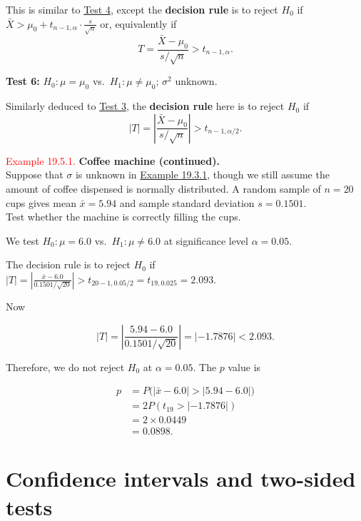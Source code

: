 \documentclass[
]{book}
\begin{document}
This is similar to \protect\hyperlink{Sec_Hypo_Test:test4}{Test 4}, except the {\textbf{decision rule}} is to reject \(H_0\) if \(\bar{X} > \mu_0 + t_{n-1,\alpha} \cdot \frac{s}{\sqrt{n}}\) or, equivalently if\\

\[T = \frac{\bar{X} - \mu_0}{s/\sqrt{n}} > t_{n-1,\alpha}.\]

\leavevmode{}%
{\textbf{Test 6:}} \(H_0: \mu = \mu_0\) vs.~\(H_1: \mu \neq \mu_0\); \(\sigma^2\) unknown.

Similarly deduced to \protect\hyperlink{Sec_Hypo_Test:test3}{Test 3}, the {\textbf{decision rule}} here is to reject \(H_0\) if\\

\[|T| = \left| \frac{\bar{X}-\mu_0}{s/\sqrt{n}} \right| > t_{n-1,\alpha/2}.\]

\leavevmode{}%
\textcolor{red}{Example 19.5.1.}
{\textbf{Coffee machine (continued).}}\\
Suppose that \(\sigma\) is unknown in \protect\hyperlink{coffee_machine_ex}{Example 19.3.1}, though we still assume the amount of coffee dispensed is normally distributed. A random sample of \(n=20\) cups gives mean \(\bar{x} = 5.94\) and sample standard deviation \(s = 0.1501\).\\
Test whether the machine is correctly filling the cups.

We test \(H_0: \mu = 6.0\) vs.~\(H_1: \mu \neq 6.0\) at significance level \(\alpha = 0.05\).

The decision rule is to reject \(H_0\) if \(|T| = \left| \frac{\bar{x}-6.0}{0.1501/\sqrt{20}} \right| > t_{20-1,0.05/2}= t_{19,0.025} = 2.093\).

Now

\[ |T| = \left| \frac{5.94 - 6.0}{0.1501/\sqrt{20}} \right| = |-1.7876| < 2.093.\]

Therefore, we do not reject \(H_0\) at \(\alpha=0.05\). The \(p\) value is

\begin{align*}
p &= P \big( \lvert \bar{x} - 6.0 \rvert > |5.94 - 6.0| \big) \\ 
&= 2 P(t_{19} > |-1.7876|) \\ 
&= 2 \times 0.0449 \\
&= 0.0898.
\end{align*}

\hfill\break

\hypertarget{Sec_Hypo_Test:twosided}{%
\section{Confidence intervals and two-sided tests}\label{Sec_Hypo_Test:twosided}}
\end{document}
